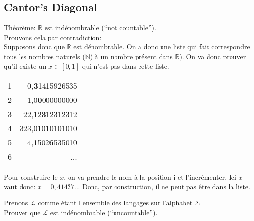 \documentclass[a4paper,12pt]{article}
\begin{document}
  \subsection{Cantor's Diagonal}
    Théorème: $\mathbb{R}$ est indénombrable (``not countable'').\\
    Prouvons cela par contradiction:\\
    Supposons donc que $\mathbb{R}$ est dénombrable.  On a donc une liste qui fait correspondre tous les nombres naturels ($\mathbb{N}$) à un nombre présent dans $\mathbb{R}$).  On va donc prouver qu'il existe un $x \in [0, 1]$ qui n'est pas dans cette liste.
    \begin{table}[h]
      \centering
      \begin{tabular}{lr}
      \multicolumn{1}{l|}{1} & 0,\textbf{3}1415926535   \\
      \multicolumn{1}{l|}{2} & 1,0\textbf{0}000000000   \\
      \multicolumn{1}{l|}{3} & 22,12\textbf{3}12312312  \\
      \multicolumn{1}{l|}{4} & 323,010\textbf{1}0101010 \\
      \multicolumn{1}{l|}{5} & 4,1502\textbf{6}535010	\\
      \multicolumn{1}{l|}{6} & ...
      \end{tabular}
    \end{table}
    Pour construire le $x$, on va prendre le nom à la position i et l'incrémenter.  Ici $x$ vaut donc:
    $x = 0,41427...$  Donc, par construction, il ne peut pas être dans la liste.
  
  Prenons $\mathcal{L}$ comme étant l'ensemble des langages sur l'alphabet $\Sigma$\\
  Prouver que $\mathcal{L}$ est indénombrable (``uncountable'').
  
  
    
\end{document}
